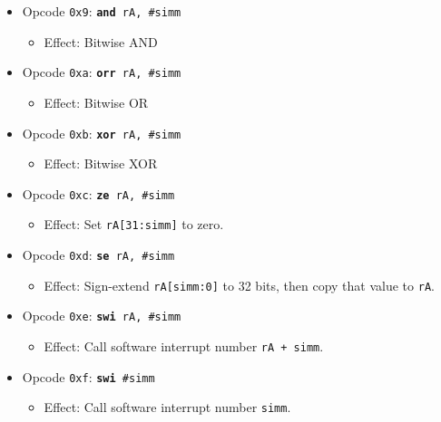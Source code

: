 \documentclass{article}
\begin{document}
\begin{itemize}
\begin{itemize}
		\end{itemize}
	\item Opcode \texttt{0x9}:
		\texttt{\textbf{and} rA, \#simm}
		\begin{itemize}
		\item Effect: Bitwise AND
		\end{itemize}
	\item Opcode \texttt{0xa}:
		\texttt{\textbf{orr} rA, \#simm}
		\begin{itemize}
		\item Effect: Bitwise OR
		\end{itemize}
	\item Opcode \texttt{0xb}:
		\texttt{\textbf{xor} rA, \#simm}
		\begin{itemize}
		\item Effect: Bitwise XOR
		\end{itemize}
	\item Opcode \texttt{0xc}:
		\texttt{\textbf{ze} rA, \#simm}
		\begin{itemize}
		\item Effect: Set \texttt{rA[31:simm]} to zero.
		\end{itemize}
	\item Opcode \texttt{0xd}:
		\texttt{\textbf{se} rA, \#simm}
		\begin{itemize}
		\item Effect:
			Sign-extend \texttt{rA[simm:0]} to 32 bits, then copy that
			value to \texttt{rA}.
		\end{itemize}
	\item Opcode \texttt{0xe}:
		\texttt{\textbf{swi} rA, \#simm}
		\begin{itemize}
		\item Effect:
			Call software interrupt number \texttt{rA + simm}.
		\end{itemize}
	\item Opcode \texttt{0xf}:
		\texttt{\textbf{swi} \#simm}
		\begin{itemize}
		\item Effect:
			Call software interrupt number \texttt{simm}.
		\end{itemize}

\end{itemize}
\end{document}
